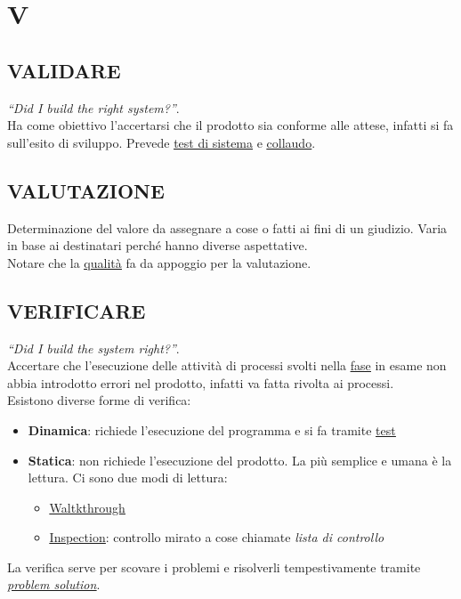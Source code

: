 \newpage
	\section{V} \label{sec:V}

		\subsection{VALIDARE}  \label{validare}
		\textit{``Did I build the right system?''}. \\
		Ha come obiettivo l'accertarsi che il prodotto sia conforme alle attese, infatti si fa sull'esito di sviluppo.
		Prevede \underline{\hyperref[testsistema]{test di sistema}} e \underline{\hyperref[collaudo]{collaudo}}.

		\subsection{VALUTAZIONE}
		Determinazione del valore da assegnare a cose o fatti ai fini di un giudizio.
		Varia in base ai destinatari perché hanno diverse aspettative. \\
		Notare che la \underline{\hyperref[qualita]{qualità}} fa da appoggio per la valutazione.

		\subsection{VERIFICARE}  \label{verificare}
		\textit{``Did I build the system right?''}. \\
		Accertare che l'esecuzione delle attività di processi svolti nella \underline{\hyperref[fase]{fase}} in esame non abbia introdotto errori nel prodotto, infatti va fatta rivolta ai processi. \\
		Esistono diverse forme di verifica:	%
		\begin{itemize}
			\item \textbf{Dinamica}: richiede l'esecuzione del programma e si fa tramite \underline{\hyperref[test]{test}}
			\item \textbf{Statica}: non richiede l'esecuzione del prodotto. La più semplice e umana è la lettura.
			Ci sono due modi di lettura:
			\begin{itemize}
				\item \underline{\hyperref[walkthrough]{Waltkthrough}}
				\item \underline{\hyperref[inspection]{Inspection}}: controllo mirato a cose chiamate \textit{lista di controllo}
			\end{itemize}
		\end{itemize}
		La verifica serve per scovare i problemi e risolverli tempestivamente tramite \textit{\underline{\hyperref[problemsolution]{problem solution}}}.

